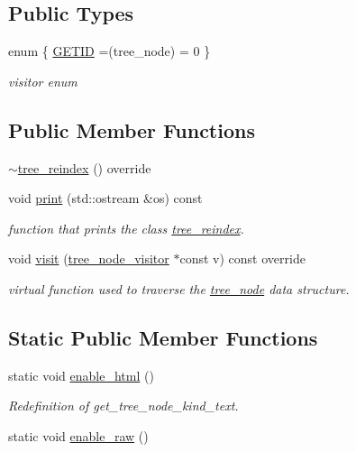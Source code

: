 \subsection*{Public Types}
\begin{DoxyCompactItemize}
\item 
enum \{ \hyperlink{classtree__reindex_ad83affcf938c67e83bb164fcedf11927a04780db44061775480bab7b35b4430a1}{G\+E\+T\+ID} =(tree\+\_\+node) = 0
 \}\begin{DoxyCompactList}\small\item\em visitor enum \end{DoxyCompactList}
\end{DoxyCompactItemize}
\subsection*{Public Member Functions}
\begin{DoxyCompactItemize}
\item 
\hyperlink{classtree__reindex_a06ddb155c756efea3cafb985519fb2cf}{$\sim$tree\+\_\+reindex} () override
\item 
void \hyperlink{classtree__reindex_a5cbc2125a1f6e85c397b87d0d00507d9}{print} (std\+::ostream \&os) const
\begin{DoxyCompactList}\small\item\em function that prints the class \hyperlink{classtree__reindex}{tree\+\_\+reindex}. \end{DoxyCompactList}\item 
void \hyperlink{classtree__reindex_ac43e08cc9a1eb305e7c38940909493c4}{visit} (\hyperlink{classtree__node__visitor}{tree\+\_\+node\+\_\+visitor} $\ast$const v) const override
\begin{DoxyCompactList}\small\item\em virtual function used to traverse the \hyperlink{classtree__node}{tree\+\_\+node} data structure. \end{DoxyCompactList}\end{DoxyCompactItemize}
\subsection*{Static Public Member Functions}
\begin{DoxyCompactItemize}
\item 
static void \hyperlink{classtree__reindex_a80b53293354209465e092408863d3752}{enable\+\_\+html} ()
\begin{DoxyCompactList}\small\item\em Redefinition of get\+\_\+tree\+\_\+node\+\_\+kind\+\_\+text. \end{DoxyCompactList}\item 
static void \hyperlink{classtree__reindex_a7f1a1a03af0e0163794ff438c1c4ba8c}{enable\+\_\+raw} ()
\end{DoxyCompactItemize}
